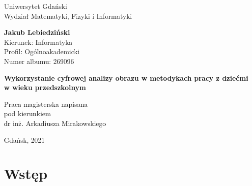\documentclass{article}
\begin{document}
	
\begin{titlepage}
	\begin{center}
		\vspace{0.5cm}
		
		\Large
		Uniwersytet Gdański\\
		Wydział Matematyki, Fizyki i Informatyki\\
		
		\vspace{2cm}
		
		\textbf{Jakub Lebiedziński}\\
		\vspace{0.75cm}
		Kierunek: Informatyka\\
		Profil: Ogólnoakademicki\\
		Numer albumu: 269096
		
		\vspace*{3cm}
		
		\LARGE
		\textbf{Wykorzystanie cyfrowej analizy obrazu w metodykach pracy z dziećmi w wieku przedszkolnym}   
		
		\begin{flushright}
			\vfill
			
			Praca magisterska napisana\\ pod kierunkiem\\
			dr inż. Arkadiusza Mirakowskiego
		\end{flushright}            
		
		\vspace{2.5cm}
		Gdańsk, 2021    
		
	\end{center}
\end{titlepage}


	
	\linespread{1.3} %
	\large %
	
	\newpage
	\renewcommand*\contentsname{Spis treści}
	\tableofcontents
	\newpage
	
	\renewcommand{\figurename}{Rysunek}
	
	\section*{Wstęp}
	
\end{document}
